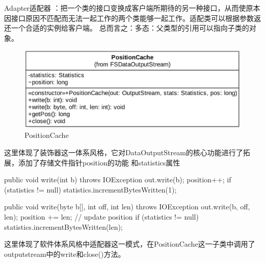 Adapter适配器 ：把一个类的接口变换成客户端所期待的另一种接口，从而使原本因接口原因不匹配而无法一起工作的两个类能够一起工作。适配类可以根据参数返还一个合适的实例给客户端。
总而言之：多态：父类型的引用可以指向子类的对象。
\begin{figure}[h]
\centering
\includegraphics[width =1\linewidth]{positioncache.png}
\caption{PositionCache}
\label{fig:sa:PositionCache}
\end{figure}
这里体现了装饰器这一体系风格，它对DataOutputStream的核心功能进行了拓展，添加了存储文件指针position的功能
和statistics属性
\begin{java}
public void write(int b) throws IOException {
  out.write(b);
  position++;
  if (statistics != null) {
    statistics.incrementBytesWritten(1);
  }
}

public void write(byte b[], int off, int len) throws IOException {
  out.write(b, off, len);
  position += len;                            // update position
  if (statistics != null) {
    statistics.incrementBytesWritten(len);
  }
}
\end{java}
这里体现了软件体系风格中适配器这一模式，在PositionCache这一子类中调用了outputstream中的write和close()方法。


\endinput
